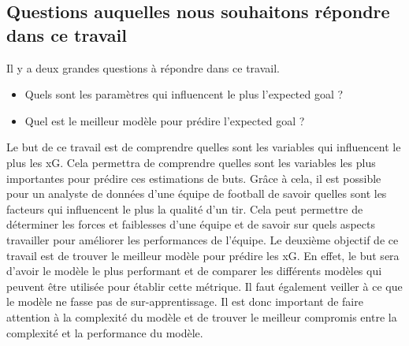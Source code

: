 \documentclass[12pt]{article}
\begin{document}
\subsection{Questions auquelles nous souhaitons répondre dans ce travail}
Il y a deux grandes questions à répondre dans ce travail.
\begin{itemize}
    \item Quels sont les paramètres qui influencent le plus l'expected goal ?
    \item Quel est le meilleur modèle pour prédire l'expected goal ?
\end{itemize}

Le but de ce travail est de comprendre quelles sont les variables qui influencent le plus les xG.
Cela permettra de comprendre quelles sont les variables les plus importantes pour prédire ces estimations de buts.
Grâce à cela, il est possible pour un analyste de données d'une équipe de football de savoir quelles sont les facteurs qui influencent le plus la qualité d'un tir.
Cela peut permettre de déterminer les forces et faiblesses d'une équipe et de savoir sur quels aspects travailler pour améliorer les performances de l'équipe.
\newline \newline
Le deuxième objectif de ce travail est de trouver le meilleur modèle pour prédire les xG.
En effet, le but sera d'avoir le modèle le plus performant et de comparer les différents modèles qui peuvent être utilisée pour établir cette métrique.
Il faut également veiller à ce que le modèle ne fasse pas de sur-apprentissage. Il est donc important de faire attention à la complexité du modèle et de trouver le meilleur compromis entre la complexité et la performance du modèle.

\newpage
\end{document}
